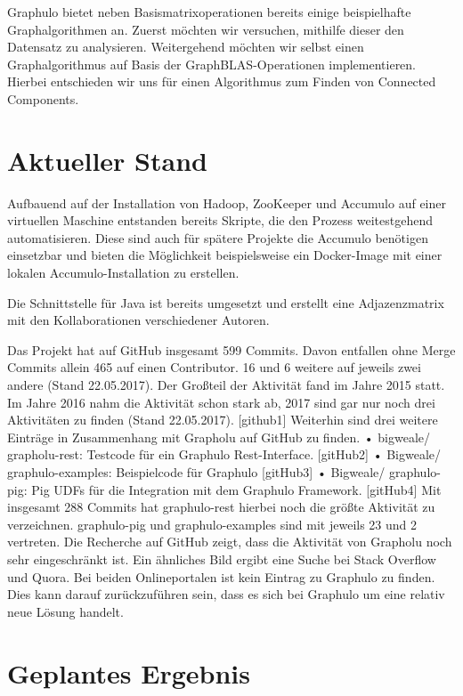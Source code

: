 \documentclass{article}
\begin{document}
Graphulo bietet neben Basismatrixoperationen bereits einige beispielhafte Graphalgorithmen an. Zuerst möchten wir versuchen, mithilfe dieser den Datensatz zu analysieren. Weitergehend möchten wir selbst einen Graphalgorithmus auf Basis der GraphBLAS-Operationen implementieren. Hierbei entschieden wir uns für einen Algorithmus zum Finden von Connected Components. 


\section{Aktueller Stand}

Aufbauend auf der Installation von Hadoop, ZooKeeper und Accumulo auf einer virtuellen Maschine entstanden bereits Skripte, die den Prozess weitestgehend automatisieren. Diese sind auch für spätere Projekte die Accumulo benötigen einsetzbar und bieten die Möglichkeit beispielsweise ein Docker-Image mit einer lokalen Accumulo-Installation zu erstellen.

Die Schnittstelle für Java ist bereits umgesetzt und erstellt eine Adjazenzmatrix mit den Kollaborationen verschiedener Autoren.

Das Projekt hat auf GitHub insgesamt 599 Commits. Davon entfallen ohne Merge Commits allein 465 auf einen Contributor. 16 und 6 weitere auf jeweils zwei andere (Stand 22.05.2017).
Der Großteil der Aktivität fand im Jahre 2015 statt. Im Jahre 2016 nahm die Aktivität schon stark ab, 2017 sind gar nur noch drei Aktivitäten zu finden (Stand 22.05.2017). [github1]
Weiterhin sind drei weitere Einträge in Zusammenhang mit Grapholu auf GitHub zu finden.
•	bigweale/ grapholu-rest: Testcode für ein Graphulo Rest-Interface. [gitHub2]
•	Bigweale/ graphulo-examples: Beispielcode für Graphulo [gitHub3]
•	Bigweale/ graphulo-pig: Pig UDFs für die Integration mit dem Graphulo Framework. [gitHub4]
Mit insgesamt 288 Commits hat graphulo-rest hierbei noch die größte Aktivität zu verzeichnen.  graphulo-pig und graphulo-examples sind mit jeweils 23 und 2 vertreten.  Die Recherche auf GitHub zeigt, dass die Aktivität von Grapholu noch sehr eingeschränkt ist. Ein ähnliches Bild ergibt eine Suche bei Stack Overflow und Quora. Bei beiden Onlineportalen ist kein Eintrag zu Graphulo zu finden. Dies kann darauf zurückzuführen sein, dass es sich bei Graphulo um eine relativ neue Lösung handelt. 



\section{Geplantes Ergebnis}
\end{document}
